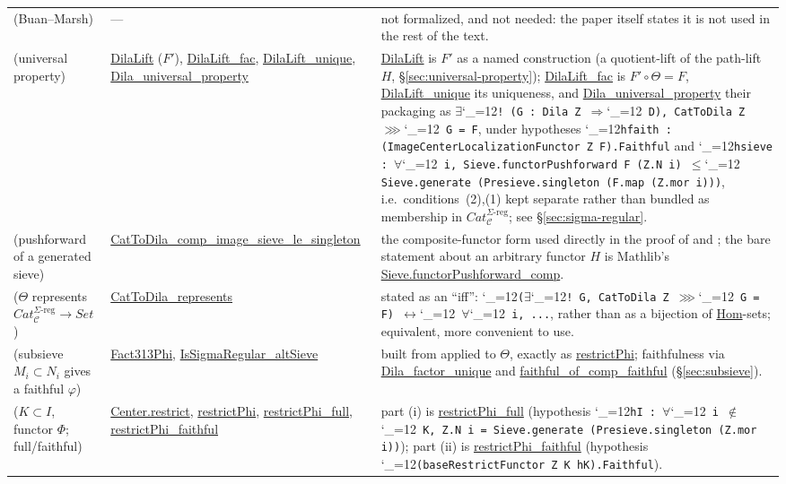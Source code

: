 \documentclass[11pt]{amsart}
\newcommand{\lc}[1]{\url{#1}}
\newcommand{\lcode}{\begingroup\catcode`\_=12\relax\lcodeInner}
\newcommand{\lcodeInner}[1]{\texttt{#1}\endgroup}
\theoremstyle{plain}
\theoremstyle{definition}
\theoremstyle{remark}
\newcommand{\calC}{\mathcal C}
\begin{document}
\begin{longtable}{@{}p{2.55cm}p{4.1cm}p{4.75cm}@{}}
\citep[Remark~3.9]{Mayeux} (Buan--Marsh) & --- & not formalized, and not needed: the paper itself states it is not used in the rest of the text. \\
\citep[Theorem~3.10]{Mayeux} (universal property) & \lc{DilaLift} ($F'$), \lc{DilaLift_fac}, \lc{DilaLift_unique}, \lc{Dila_universal_property} & \lc{DilaLift} is $F'$ as a named construction (a quotient-lift of the path-lift $H$, \S\ref{sec:universal-property}); \lc{DilaLift_fac} is $F' \circ \Theta = F$, \lc{DilaLift_unique} its uniqueness, and \lc{Dila_universal_property} their packaging as \ensuremath{\exists}\lcode{! (G : Dila Z }\ensuremath{\Rightarrow}\lcode{ D), CatToDila Z }\ensuremath{\ggg}\lcode{ G = F}, under hypotheses \lcode{hfaith : (ImageCenterLocalizationFunctor Z F).Faithful} and \lcode{hsieve : }\ensuremath{\forall}\lcode{ i, Sieve.functorPushforward F (Z.N i) }\ensuremath{\leq}\lcode{ Sieve.generate (Presieve.singleton (F.map (Z.mor i)))}, i.e.\ conditions~(2),(1) kept separate rather than bundled as membership in $Cat_\calC^{\Sigma\text{-reg}}$; see \S\ref{sec:sigma-regular}. \\
\citep[Fact~3.11]{Mayeux} (pushforward of a generated sieve) & \lc{CatToDila_comp_image_sieve_le_singleton} & the composite-functor form used directly in the proof of \citep[Theorem~3.10]{Mayeux} and \citep[Proposition~3.12]{Mayeux}; the bare statement about an arbitrary functor $H$ is Mathlib's \lc{Sieve.functorPushforward_comp}. \\
\citep[Proposition~3.12]{Mayeux} ($\Theta$ represents $Cat_\calC^{\Sigma\text{-reg}}\to Set$) & \lc{CatToDila_represents} & stated as an ``iff'': \lcode{(}\ensuremath{\exists}\lcode{! G, CatToDila Z }\ensuremath{\ggg}\lcode{ G = F) }\ensuremath{\leftrightarrow}\lcode{ }\ensuremath{\forall}\lcode{ i, ...}, rather than as a bijection of \lc{Hom}-sets; equivalent, more convenient to use. \\
\citep[Fact~3.13]{Mayeux} (subsieve $M_i \subset N_i$ gives a faithful $\varphi$) & \lc{Fact313Phi}, \lc{IsSigmaRegular_altSieve} & built from \citep[Theorem~3.10]{Mayeux} applied to $\Theta$, exactly as \lc{restrictPhi}; faithfulness via \lc{Dila_factor_unique} and \lc{faithful_of_comp_faithful} (\S\ref{sec:subsieve}). \\
\citep[Proposition~3.14]{Mayeux} ($K \subset I$, functor $\Phi$; full/faithful) & \lc{Center.restrict}, \lc{restrictPhi}, \lc{restrictPhi_full}, \lc{restrictPhi_faithful} & part (i) is \lc{restrictPhi_full} (hypothesis \lcode{hI : }\ensuremath{\forall}\lcode{ i }\ensuremath{\notin}\lcode{ K, Z.N i = Sieve.generate (Presieve.singleton (Z.mor i))}); part (ii) is \lc{restrictPhi_faithful} (hypothesis \lcode{(baseRestrictFunctor Z K hK).Faithful}). \\

\end{longtable}
\end{document}
